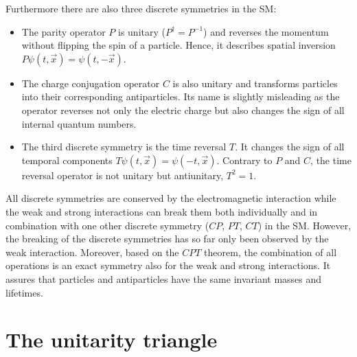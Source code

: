 Furthermore there are also three discrete symmetries in the \ac{SM}:
\begin{itemize}
	\item The parity operator $P$ is unitary ($P^{\dagger}=P^{-1}$) and reverses the momentum without flipping the spin of a particle.
		Hence, it describes spatial inversion $P\psi\left(t,\vec{x}\right) = \psi\left(t,-\vec{x}\right)$.
	\item The charge conjugation operator $C$ is also unitary and transforms particles into their corresponding antiparticles.
		Its name is slightly misleading as the operator reverses not only the electric charge but also changes the sign of all internal quantum numbers.
	\item The third discrete symmetry is the time reversal $T$.
		It changes the sign of all temporal components $T\psi\left(t,\vec{x}\right) = \psi\left(-t,\vec{x}\right)$.
		Contrary to $P$ and $C$, the time reversal operator is not unitary but antiunitary, \ie $T^2=1$.
\end{itemize}
All discrete symmetries are conserved by the electromagnetic interaction while the weak and strong interactions can break them both
individually and in combination with one other discrete symmetry ($CP$, $PT$, $CT$) in the \ac{SM}.
However, the breaking of the discrete symmetries has so far only been observed by the weak interaction.
Moreover, based on the $CPT$ theorem, the combination of all operations is an exact symmetry also for the weak and strong interactions.
It assures that particles and antiparticles have the same invariant masses and lifetimes.

\section{The unitarity triangle}
\label{sec:unitarityTriangle}

